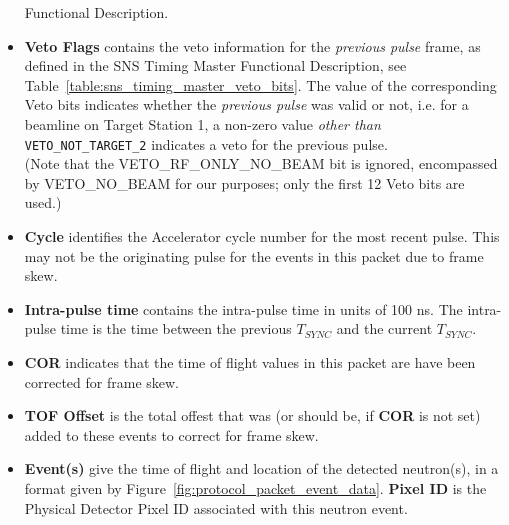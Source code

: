 \begin{itemize}
Functional Description.
\item{\bf Veto Flags} contains the veto information
for the {\it previous pulse} frame,
as defined in the SNS Timing Master Functional Description,
see Table~\ref{table:sns_timing_master_veto_bits}.
The value of the corresponding Veto bits indicates whether the
{\it previous pulse} was valid or not,
i.e. for a beamline on Target Station 1,
a non-zero value {\it other than } {\tt VETO\_NOT\_TARGET\_2}
indicates a veto for the previous pulse. \\
(Note that the VETO\_RF\_ONLY\_NO\_BEAM bit is ignored,
encompassed by VETO\_NO\_BEAM for our purposes;
only the first 12 Veto bits are used.)
\item{\bf Cycle} identifies the Accelerator cycle number for the most
recent pulse. This may not be the originating pulse for the events in this
packet due to frame skew.
\item{\bf Intra-pulse time} contains the intra-pulse time in units of 100 ns.
The intra-pulse time is the time between the previous $T_{SYNC}$ and the
current $T_{SYNC}$.
\item{\bf COR} indicates that the time of flight values in this packet are
have been corrected for frame skew.
\item{\bf TOF Offset} is the total offest that was (or should be, if {\bf COR}
is not set) added to these events to correct for frame skew.
\item{\bf Event(s)} give the time of flight and location of the detected
neutron(s), in a format given by Figure~\ref{fig:protocol_packet_event_data}.
{\bf Pixel ID} is the Physical Detector Pixel ID
associated with this neutron event.
\end{itemize}

